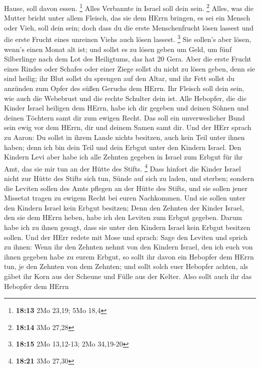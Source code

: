 Hause, soll davon essen. \footnote{\textbf{18:13} 2Mo 23,19; 5Mo 18,4}
 Alles Verbannte in Israel soll dein sein. \footnote{\textbf{18:14}
  3Mo 27,28}  Alles, was die Mutter bricht unter allem
Fleisch, das sie dem HErrn bringen, es sei ein Mensch oder Vieh, soll
dein sein; doch dass du die erste Menschenfrucht lösen lassest und die
erste Frucht eines unreinen Viehs auch lösen lassest. \footnote{\textbf{18:15}
  2Mo 13,12-13; 2Mo 34,19-20}  Sie sollen's aber lösen,
wenn's einen Monat alt ist; und sollst es zu lösen geben um Geld, um
fünf Silberlinge nach dem Lot des Heiligtums, das hat 20 Gera.
 Aber die erste Frucht eines Rindes oder Schafes oder einer
Ziege sollst du nicht zu lösen geben, denn sie sind heilig; ihr Blut
sollst du sprengen auf den Altar, und ihr Fett sollst du anzünden zum
Opfer des süßen Geruchs dem HErrn.  Ihr Fleisch soll dein
sein, wie auch die Webebrust und die rechte Schulter dein ist.
 Alle Hebopfer, die die Kinder Israel heiligen dem HErrn,
habe ich dir gegeben und deinen Söhnen und deinen Töchtern samt dir zum
ewigen Recht. Das soll ein unverweslicher Bund sein ewig vor dem HErrn,
dir und deinem Samen samt dir.  Und der HErr sprach zu
Aaron: Du sollst in ihrem Lande nichts besitzen, auch kein Teil unter
ihnen haben; denn ich bin dein Teil und dein Erbgut unter den Kindern
Israel.  Den Kindern Levi aber habe ich alle Zehnten
gegeben in Israel zum Erbgut für ihr Amt, das sie mir tun an der Hütte
des Stifts. \footnote{\textbf{18:21} 3Mo 27,30}  Dass
hinfort die Kinder Israel nicht zur Hütte des Stifts sich tun, Sünde auf
sich zu laden, und sterben;  sondern die Leviten sollen des
Amts pflegen an der Hütte des Stifts, und sie sollen jener Missetat
tragen zu ewigem Recht bei euren Nachkommen. Und sie sollen unter den
Kindern Israel kein Erbgut besitzen;  Denn den Zehnten der
Kinder Israel, den sie dem HErrn heben, habe ich den Leviten zum Erbgut
gegeben. Darum habe ich zu ihnen gesagt, dass sie unter den Kindern
Israel kein Erbgut besitzen sollen.  Und der HErr redete
mit Mose und sprach:  Sage den Leviten und sprich zu ihnen:
Wenn ihr den Zehnten nehmt von den Kindern Israel, den ich euch von
ihnen gegeben habe zu eurem Erbgut, so sollt ihr davon ein Hebopfer dem
HErrn tun, je den Zehnten von dem Zehnten;  und sollt solch
euer Hebopfer achten, als gäbet ihr Korn aus der Scheune und Fülle aus
der Kelter.  Also sollt auch ihr das Hebopfer dem HErrn

